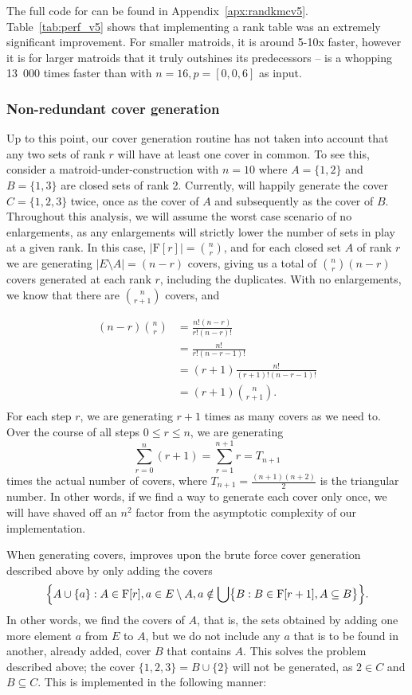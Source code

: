 The full code for  can be found in Appendix~\ref{apx:randkmcv5}. Table~\ref{tab:perf_v5} shows that implementing a rank table was an extremely significant improvement. For smaller matroids, it is around 5-10x faster, however it is for larger matroids that it truly outshines its predecessors --  is a whopping 13~000 times faster than  with $n=16, p=[0,0,6]$ as input.


\subsubsection{Non-redundant cover generation}
Up to this point, our cover generation routine has not taken into account that any two sets of rank $r$ will have at least one cover in common. To see this, consider a matroid-under-construction with $n=10$ where $A = \{1,2\}$ and $B = \{1,3\}$ are closed sets of rank 2. Currently,  will happily generate the cover $C=\{1,2,3\}$ twice, once as the cover of $A$ and subsequently as the cover of $B$. Throughout this analysis, we will assume the worst case scenario of no enlargements, as any enlargements will strictly lower the number of sets in play at a given rank. In this case, $|\mathrm{F}[r]| = \binom{n}{r}$, and for each closed set $A$ of rank $r$ we are generating $|E\setminus A| = (n-r)$ covers, giving us a total of $\binom{n}{r}(n-r)$ covers generated at each rank $r$, including the duplicates. With no enlargements, we know that there are $\binom{n}{r+1}$ covers, and

$$\begin{aligned}
  (n-r)\binom{n}{r} &= \frac{n!(n-r)}{r!(n-r)!} \\
                    &= \frac{n!}{r!(n-r-1)!} \\
                    &= (r+1)\frac{n!}{(r+1)!(n-r-1)!} \\
                    &= (r+1)\binom{n}{r+1}. \\
\end{aligned}$$
For each step $r$, we are generating $r+1$ times as many covers as we need to. Over the course of all steps $0\leq r\leq n$, we are generating $$\sum_{r=0}^n (r+1) = \sum_{r=1}^{n+1}r = T_{n+1}$$ times the actual number of covers, where $T_{n+1}=\frac{(n+1)(n+2)}{2}$ is the triangular number. In other words, if we find a way to generate each cover only once, we will have shaved off an $n^2$ factor from the asymptotic complexity of our implementation.

When generating covers,  improves upon the brute force cover generation described above by only adding the covers 
$$\Bigl\{ A \cup \{ a \} : A \in \mathrm{F}[r], a \in E \setminus A, a \notin \bigcup \bigl\{ B : B \in \mathrm{F}[r+1], A \subseteq B \bigr\} \Bigr\}.$$
In other words, we find the covers of $A$, that is, the sets obtained by adding one more element $a$ from $E$ to $A$, but we do not include any $a$ that is to be found in another, already added, cover $B$ that contains $A$. This solves the problem described above; the cover $\{1,2,3\} = B \cup \{ 2 \}$ will not be generated, as $2 \in C$ and $B \subseteq C$. This is implemented in the following manner:

